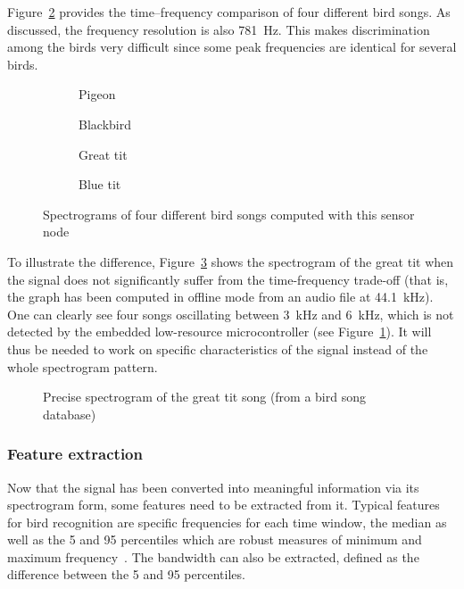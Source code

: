 \documentclass{EPL-master-thesis-covers-EN}
\begin{document}
Figure~\ref{fig:4birds} provides the time--frequency comparison of four different bird songs. As discussed, the frequency resolution is also \SI{781}{Hz}. This makes discrimination among the birds very difficult since some peak frequencies are identical for several birds.

\begin{figure}[H]
\begin{subfigure}{.49\textwidth}
  \centering
  
  \caption{Pigeon}
\end{subfigure}
\begin{subfigure}{.49\textwidth}
  \centering
  
  \caption{Blackbird}
\end{subfigure}
\newline
\begin{subfigure}{.49\textwidth}
  \centering
  
  \caption{Great tit}
  \label{fig:great_tit}
\end{subfigure}
\begin{subfigure}{.49\textwidth}
  \centering
  
  \caption{Blue tit}
\end{subfigure}
\caption{Spectrograms of four different bird songs computed with this sensor node}
\label{fig:4birds}
\end{figure}

To illustrate the difference, Figure~\ref{fig:greattit_full} shows the spectrogram of the great tit when the signal does not significantly suffer from the time-frequency trade-off (that is, the graph has been computed in offline mode from an audio file at \SI{44.1}{kHz}). One can clearly see four songs oscillating between \SI{3}{kHz} and \SI{6}{kHz}, which is not detected by the embedded low-resource microcontroller (see Figure~\ref{fig:great_tit}). It will thus be needed to work on specific characteristics of the signal instead of the whole spectrogram pattern.

\begin{figure}[H]
    \centering
    
    \caption{Precise spectrogram of the great tit song (from a bird song database)}
    \label{fig:greattit_full}
\end{figure}

\subsubsection*{Feature extraction}

Now that the signal has been converted into meaningful information via its spectrogram form, some features need to be extracted from it. Typical features for bird recognition are specific frequencies for each time window, the median as well as the 5 and 95 percentiles which are robust measures of minimum and maximum frequency~\cite{Stowell}. The bandwidth can also be extracted, defined as the difference between the 5 and 95 percentiles. 
\end{document}
